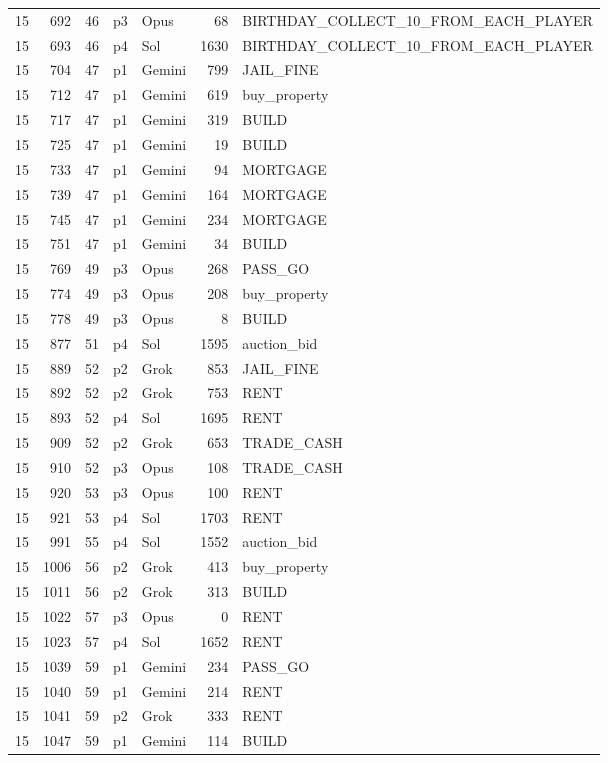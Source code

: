 \begin{longtable}{r r r l l r >{\ttfamily}l}
15 & 692 & 46 & p3 & Opus & 68 & BIRTHDAY\_COLLECT\_10\_FROM\_EACH\_PLAYER \\
15 & 693 & 46 & p4 & Sol & 1630 & BIRTHDAY\_COLLECT\_10\_FROM\_EACH\_PLAYER \\
15 & 704 & 47 & p1 & Gemini & 799 & JAIL\_FINE \\
15 & 712 & 47 & p1 & Gemini & 619 & buy\_property \\
15 & 717 & 47 & p1 & Gemini & 319 & BUILD \\
15 & 725 & 47 & p1 & Gemini & 19 & BUILD \\
15 & 733 & 47 & p1 & Gemini & 94 & MORTGAGE \\
15 & 739 & 47 & p1 & Gemini & 164 & MORTGAGE \\
15 & 745 & 47 & p1 & Gemini & 234 & MORTGAGE \\
15 & 751 & 47 & p1 & Gemini & 34 & BUILD \\
15 & 769 & 49 & p3 & Opus & 268 & PASS\_GO \\
15 & 774 & 49 & p3 & Opus & 208 & buy\_property \\
15 & 778 & 49 & p3 & Opus & 8 & BUILD \\
15 & 877 & 51 & p4 & Sol & 1595 & auction\_bid \\
15 & 889 & 52 & p2 & Grok & 853 & JAIL\_FINE \\
15 & 892 & 52 & p2 & Grok & 753 & RENT \\
15 & 893 & 52 & p4 & Sol & 1695 & RENT \\
15 & 909 & 52 & p2 & Grok & 653 & TRADE\_CASH \\
15 & 910 & 52 & p3 & Opus & 108 & TRADE\_CASH \\
15 & 920 & 53 & p3 & Opus & 100 & RENT \\
15 & 921 & 53 & p4 & Sol & 1703 & RENT \\
15 & 991 & 55 & p4 & Sol & 1552 & auction\_bid \\
15 & 1006 & 56 & p2 & Grok & 413 & buy\_property \\
15 & 1011 & 56 & p2 & Grok & 313 & BUILD \\
15 & 1022 & 57 & p3 & Opus & 0 & RENT \\
15 & 1023 & 57 & p4 & Sol & 1652 & RENT \\
15 & 1039 & 59 & p1 & Gemini & 234 & PASS\_GO \\
15 & 1040 & 59 & p1 & Gemini & 214 & RENT \\
15 & 1041 & 59 & p2 & Grok & 333 & RENT \\
15 & 1047 & 59 & p1 & Gemini & 114 & BUILD \\

\end{longtable}
